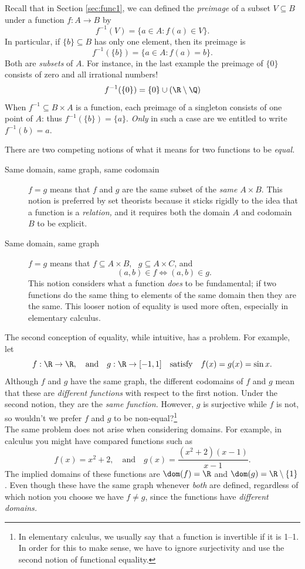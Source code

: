 Recall that in Section \ref{sec:func1}, we can defined the \emph{preimage} of a subset $V\subseteq B$ under a function $f:A\to B$ by
\[f^{-1}(V)=\{a\in A:f(a)\in V\}.\]
In particular, if $\{b\}\subseteq B$ has only one element, then its preimage is
\[f^{-1}(\{b\})=\{a\in A:f(a)=b\}.\]
Both are \emph{subsets} of $A$. For instance, in the last example the preimage of $\{0\}$ consists of zero and all irrational numbers!
\[f^{-1}(\{0\})=\{0\}\cup(\R\setminus\Q)\]
When $f^{-1}\subseteq B\times A$ is a function, each preimage of a singleton consists of one point of $A$: thus $f^{-1}(\{b\})=\{a\}$. \emph{Only} in such a case are we entitled to write $f^{-1}(b)=a$.\pagebreak[2]




\begin{aside}

There are two competing notions of what it means for two functions to be \emph{equal.}

\begin{description}
\item[Same domain, same graph, same codomain]\quad $f=g$ means that $f$ and $g$ are the same subset of the \emph{same} $A\times B$. This notion is preferred by set theorists because it sticks rigidly to the idea that a function is a \emph{relation,} and it requires both the domain $A$ and codomain $B$ to be explicit.
\item[Same domain, same graph]\quad $f=g$ means that $f\subseteq A\times B$, \ $g\subseteq A\times C$, and
\[(a,b)\in f\iff (a,b)\in g.\]
This notion considers what a function \emph{does} to be fundamental; if two functions do the same thing to elements of the same domain then they are the same. This looser notion of equality is used more often, especially in elementary calculus.
\end{description}

\noindent The second conception of equality, while intuitive, has a problem. For example, let
\[f:\R\to\R,\quad\text{and}\quad g:\R\to[-1,1]\quad\text{satisfy}\quad f(x)=g(x)=\sin x.\]
Although $f$ and $g$ have the same graph, the different codomains of $f$ and $g$ mean that these are \emph{different functions} with respect to the first notion. Under the second notion, they are the \emph{same function.} However, $g$ is surjective while $f$ is not, so wouldn't we prefer $f$ and $g$ to be non-equal?\footnote{In elementary calculus, we usually say that a function is invertible if it is 1--1. In order for this to make sense, we have to ignore surjectivity and use the second notion of functional equality.}\\


\noindent The same problem does not arise when considering domains. For example, in calculus you might have compared functions such as
\[f(x)=x^2+2,\quad\text{and}\quad g(x)=\frac{(x^2+2)(x-1)}{x-1}.\]
The implied domains of these functions are $\dom(f)=\R$ and $\dom(g)=\R\setminus\{1\}$. Even though these have the same graph whenever \emph{both} are defined, regardless of which notion you choose we have $f\neq g$, since the functions have \emph{different domains.}
\end{aside}

